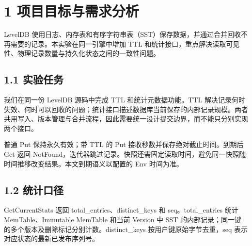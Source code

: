 \documentclass[UTF8,a4paper,10pt,twocolumn,fontset=fandol]{ctexart}
\begin{document}

\section*{1 项目目标与需求分析}
LevelDB 使用日志、内存表和有序字符串表（SST）保存数据，并通过合并回收不再需要的记录。本实验在同一引擎中增加 TTL 和统计接口，重点解决读取可见性、物理记录数量与持久化状态之间的一致性问题。

\subsection*{1.1 实验任务}
我们在同一份 LevelDB 源码中完成 TTL 和统计元数据功能。TTL 解决记录何时失效、何时可以回收的问题；统计接口描述数据库当前保存的内部记录规模。两者共用写入、版本管理与合并流程，因此需要统一设计提交边界，而不能只分别实现两个接口。

普通 Put 保持永久有效；带 TTL 的 Put 接收秒数并保存绝对截止时间。到期后 Get 返回 NotFound，迭代器跳过记录。快照还需固定读取时间，避免同一快照随时间推移改变结果。本文到期语义以配置的 Env 时间为准。

\subsection*{1.2 统计口径}
GetCurrentStats 返回 total\_entries、distinct\_keys 和 seq。total\_entries 统计 MemTable、Immutable MemTable 和当前 Version 中 SST 的内部记录；同一键的多个版本及删除标记分别计数。distinct\_keys 按用户键原始字节去重，seq 表示对应状态的最新已发布序列号。
\end{document}
